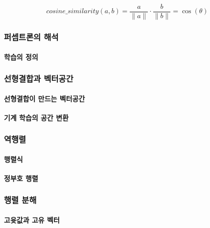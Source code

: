 \documentclass [12pt] {oblivoir}
\let\oldsubsubsection=\subsubsection
\renewcommand{\subsubsection}
{
  \filbreak
  \oldsubsubsection
}
\begin{document}
\begin{equation} \tag{2.7}
  cosine\_similarity(a, b) = \frac{a}{\lVert a \rVert} \cdot \frac{b}{\lVert b \rVert} = \cos(\theta)
\end{equation}

\subsubsection{퍼셉트론의 해석}

\paragraph*{학습의 정의}\mbox{}

\subsubsection{선형결합과 벡터공간}

\paragraph*{선형결합이 만드는 벡터공간}\mbox{}

\paragraph*{기계 학습의 공간 변환}\mbox{}

\subsubsection{역행렬}

\paragraph*{행렬식}\mbox{}

\paragraph*{정부호 행렬}\mbox{}

\subsubsection{행렬 분해}

\paragraph*{고윳값과 고유 벡터}\mbox{}
\end{document}
